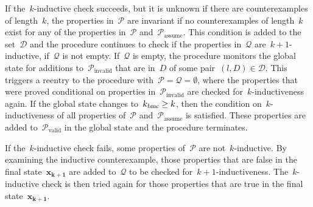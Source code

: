 \documentclass[12pt]{article}
\renewcommand{\textproc}{\textsl}
\renewcommand{\vec}[1]{\mathbf{#1}}            %
\begin{document}
If the~$k$\nobreakdash-inductive check succeeds, but it is unknown if there are counterexamples of length~$k$, the properties in~$\mathcal{P}$ are invariant if no counterexamples of length~$k$ exist for any of the properties in~$\mathcal{P}$ and~$\mathcal{P}_\mathrm{assume}$. This condition is added to the set~$\mathcal{D}$ and the procedure continues to check if the properties in~$\mathcal{Q}$ are~${k+1}$\nobreakdash-inductive, if~$\mathcal{Q}$ is not empty. If~$\mathcal{Q}$ is empty, the procedure monitors the global state for additions to~$\mathcal{P}_\mathrm{invalid}$ that are in~$D$ of some pair~${(l,D)\in\mathcal{D}}$. This triggers a reentry to the procedure with~${\mathcal{P}=\mathcal{Q}=\emptyset}$, where the properties that were proved conditional on properties in~$\mathcal{P}_\mathrm{invalid}$ are checked for~$k$\nobreakdash-inductiveness again. If the global state changes to~$k_\textproc{bmc} \geq k$, then the condition on~$k$\nobreakdash-inductiveness of all properties of~$\mathcal{P}$ and~$\mathcal{P}_\mathrm{assume}$ is satisfied. These properties are added to~$\mathcal{P}_\mathrm{valid}$ in the global state and the procedure terminates.

If the~$k$\nobreakdash-inductive check fails, some properties of~$\mathcal{P}$ are not~$k$\nobreakdash-inductive. By examining the inductive counterexample, those properties that are false in the final state~$\vec{x_{k+1}}$ are added to~$\mathcal{Q}$ to be checked for~${k+1}$\nobreakdash-inductiveness. The~$k$\nobreakdash-inductive check is then tried again for those properties that are true in the final state~$\vec{x_{k+1}}$.

  
\end{document}
